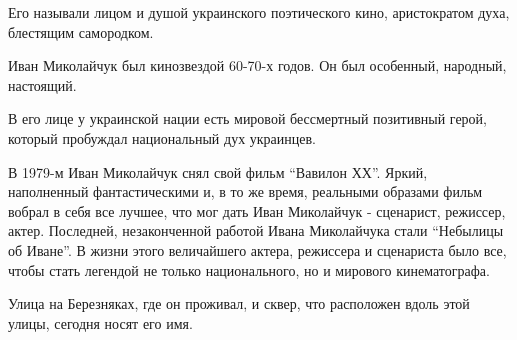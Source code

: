 Его называли лицом и душой украинского поэтического кино, аристократом духа,
блестящим самородком.

Иван Миколайчук был кинозвездой 60-70-х годов. Он был особенный, народный,
настоящий.

В его лице у украинской нации есть мировой бессмертный позитивный герой,
который пробуждал национальный дух украинцев.

В 1979-м Иван Миколайчук снял свой фильм \enquote{Вавилон ХХ}. Яркий, наполненный
фантастическими и, в то же время, реальными образами фильм вобрал в себя все
лучшее, что мог дать Иван Миколайчук - сценарист, режиссер, актер. Последней,
незаконченной работой Ивана Миколайчука стали \enquote{Небылицы об Иване}. В жизни
этого величайшего актера, режиссера и сценариста было все, чтобы стать легендой
не только национального, но и мирового кинематографа.

Улица на Березняках, где он проживал, и сквер, что расположен вдоль этой
улицы, сегодня носят его имя.


